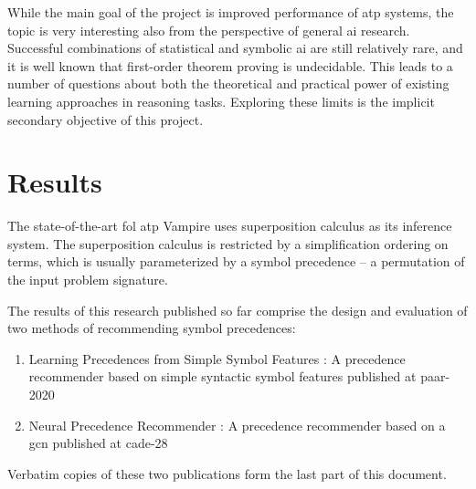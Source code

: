 \documentclass{article}
\begin{document}
While the main goal of the project is improved performance of \gls{atp} systems, the topic is very interesting also from the perspective of general \gls{ai} research. Successful combinations of statistical and symbolic \gls{ai} are still relatively rare, and it is well known that first-order theorem proving is undecidable. This leads to a number of questions about both the theoretical and practical power of existing learning approaches in reasoning tasks. Exploring these limits is the implicit secondary objective of this project.

\section{Results}

The state-of-the-art \gls{fol} \gls{atp} Vampire uses superposition calculus as its inference system.
The superposition calculus is restricted by a simplification ordering on terms,
which is usually parameterized by a symbol precedence -- a permutation of the input problem signature.

The results of this research published so far
comprise the design and evaluation of two methods of recommending symbol precedences:

\begin{enumerate}
\item Learning Precedences from Simple Symbol Features \cite{DBLP:conf/cade/Bartek020}:
A precedence recommender based on simple syntactic symbol features published at \gls{paar-2020}
\item Neural Precedence Recommender \cite{Bartek2021}:
A precedence recommender based on a \gls{gcn} published at \gls{cade-28}
\end{enumerate}

Verbatim copies of these two publications form the last part of this document.










\end{document}
